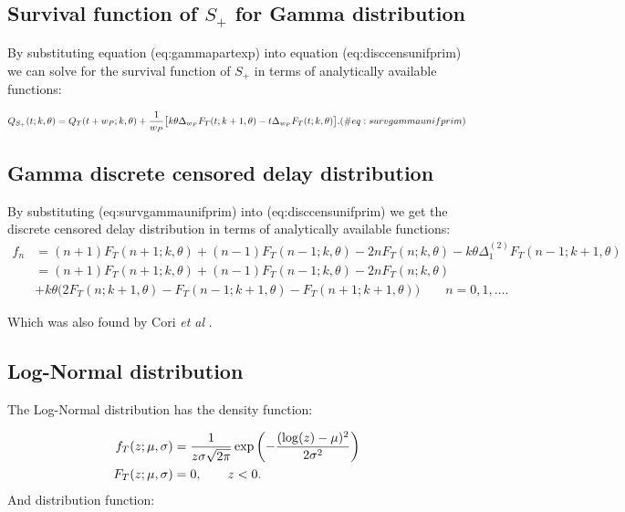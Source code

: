 \documentclass[10pt,letterpaper]{article}
\begin{document}
\subsection{Survival function of $S_{+}$ for Gamma distribution}

By substituting equation \@ref(eq:gammapartexp) into equation \@ref(eq:disccensunifprim) we can solve for the survival function of $S_+$ in terms of analytically available functions:

\begin{equation}
Q_{S_+}(t; k, \theta) = Q_T(t + w_P; k, \theta) + { 1 \over w_P} \big[ k \theta \Delta_{w_P}F_T(t; k+1, \theta) - t \Delta_{w_P}F_T(t; k, \theta) \big].
(\#eq:survgammaunifprim)
\end{equation}

\subsection{Gamma discrete censored delay distribution}

By substituting \@ref(eq:survgammaunifprim) into \@ref(eq:disccensunifprim) we get the discrete censored delay distribution in terms of analytically available functions:
\begin{equation}
\begin{aligned}
f_n &= (n+1) F_T(n+1; k, \theta) + (n-1) F_T(n-1; k, \theta) - 2  n F_T(n; k, \theta) - k \theta \Delta_1^{(2)}F_T(n-1; k+1, \theta)\\
 &= (n+1) F_T(n+1; k, \theta) + (n-1) F_T(n-1; k, \theta) - 2  n F_T(n; k, \theta) \\
 &+ k \theta \Big( 2 F_T(n; k+1, \theta) - F_T(n-1; k+1, \theta) - F_T(n+1; k+1,\theta)  \Big) \qquad n = 0, 1, \dots.
\end{aligned}
\end{equation}

Which was also found by Cori \textit{et al} \cite{Cori2013}.

\subsection{Log-Normal distribution}

The Log-Normal distribution has the density function:

\begin{equation}
\begin{aligned}
f_T(z;\mu, \sigma) &= {1 \over z \sigma \sqrt{2\pi}} \exp\left( - {(\log(z) - \mu)^2 \over 2 \sigma^2} \right)\\
F_T(z;\mu, \sigma) &= 0, \qquad z < 0.
\end{aligned}
\end{equation}
And distribution function:
\end{document}
